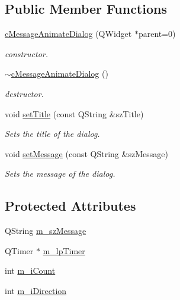 \subsection*{Public Member Functions}
\begin{DoxyCompactItemize}
\item 
\hyperlink{classc_message_animate_dialog_a44afe4f9219101f7ec076e29b950afca}{c\+Message\+Animate\+Dialog} (Q\+Widget $\ast$parent=0)
\begin{DoxyCompactList}\small\item\em constructor. \end{DoxyCompactList}\item 
\hyperlink{classc_message_animate_dialog_ab38388f68f789315665dbdee912d3a47}{$\sim$c\+Message\+Animate\+Dialog} ()
\begin{DoxyCompactList}\small\item\em destructor. \end{DoxyCompactList}\item 
void \hyperlink{classc_message_animate_dialog_a60b9bf7a04298fe0ccb98f46b16e9a5e}{set\+Title} (const Q\+String \&sz\+Title)
\begin{DoxyCompactList}\small\item\em Sets the title of the dialog. \end{DoxyCompactList}\item 
void \hyperlink{classc_message_animate_dialog_af6cae719996f9bf2d683f4cfdbd7b985}{set\+Message} (const Q\+String \&sz\+Message)
\begin{DoxyCompactList}\small\item\em Sets the message of the dialog. \end{DoxyCompactList}\end{DoxyCompactItemize}
\subsection*{Protected Attributes}
\begin{DoxyCompactItemize}
\item 
Q\+String \hyperlink{classc_message_animate_dialog_a4ae818deecaac97f7bb1914bf2dda607}{m\+\_\+sz\+Message}
\item 
Q\+Timer $\ast$ \hyperlink{classc_message_animate_dialog_a20a1bf68933e455dd515562f63976495}{m\+\_\+lp\+Timer}
\item 
int \hyperlink{classc_message_animate_dialog_a0208fa559f41307f125fa7f80b97871a}{m\+\_\+i\+Count}
\item 
int \hyperlink{classc_message_animate_dialog_a3f26bb00ddbedafdfad24c0c3a7fdfdc}{m\+\_\+i\+Direction}
\end{DoxyCompactItemize}
